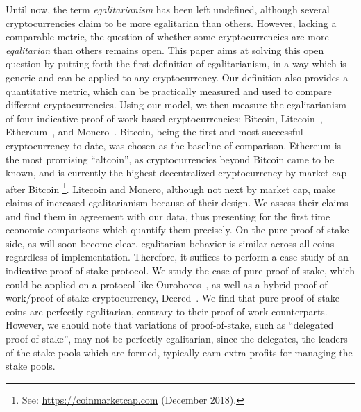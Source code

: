 Until now, the term \emph{egalitarianism} has been left undefined, although
several cryptocurrencies claim to be more egalitarian than others. However,
lacking a comparable metric, the question of whether some cryptocurrencies are
more \emph{egalitarian} than others remains open. This paper aims at solving this open question by
putting forth the first definition of egalitarianism, in a way which is
generic and can be applied to any cryptocurrency.
Our definition also provides a quantitative metric, which can be practically measured and used
to compare different cryptocurrencies.
Using our model, we then measure the egalitarianism of
four indicative proof-of-work-based
cryptocurrencies: Bitcoin, Litecoin~\cite{litecoin}, Ethereum~\cite{vitalik,wood}, and Monero~\cite{monero}. Bitcoin, being the first and most successful cryptocurrency to date, was chosen as
the baseline of comparison. Ethereum is the most promising ``altcoin'', as cryptocurrencies beyond
Bitcoin came to be known, and is currently the highest decentralized cryptocurrency by market cap after Bitcoin \footnote{See: \url{https://coinmarketcap.com} (December 2018).}.
Litecoin and Monero, although not next by market cap,
make claims  of increased egalitarianism because of their design.
We assess their claims and find them in agreement with our data, thus presenting for the first time economic comparisons which quantify them precisely.
On the pure proof-of-stake side, as will soon become clear, egalitarian
behavior is similar across all coins regardless of implementation. Therefore,
it suffices to perform a case study of an indicative proof-of-stake protocol.
We study the case of pure proof-of-stake, which could be applied on a protocol like Ouroboros~\cite{C:KRDO17},
as well as a hybrid proof-of-work/proof-of-stake cryptocurrency,
Decred~\cite{decred}. We find that pure proof-of-stake coins are perfectly
egalitarian, contrary to their proof-of-work counterparts. However, we should
note that variations of proof-of-stake, such as ``delegated proof-of-stake'',
may not be perfectly egalitarian, since the delegates, \ie the leaders of
the stake pools which are formed, typically earn extra profits for managing the
stake pools.


